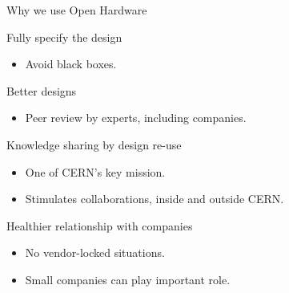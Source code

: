 \documentclass[compress,red]{beamer}
\begin{document}
\begin{frame}{Why we use Open Hardware}

  \begin{block}{Fully specify the design}
    \begin{itemize}
    \item Avoid black boxes.
    \end{itemize}
  \end{block}

  \begin{block}{Better designs}
    \begin{itemize}
    \item Peer review by experts, including companies.
    \end{itemize}
  \end{block}

  \begin{block}{Knowledge sharing by design re-use}
    \begin{itemize}
    \item One of CERN's key mission.
    \item Stimulates collaborations, inside and outside CERN.
    \end{itemize}
  \end{block}

  \begin{block}{Healthier relationship with companies}
    \begin{itemize}
    \item No vendor-locked situations.
    \item Small companies can play important role.
    \end{itemize}
  \end{block}


\end{frame}
\end{document}
